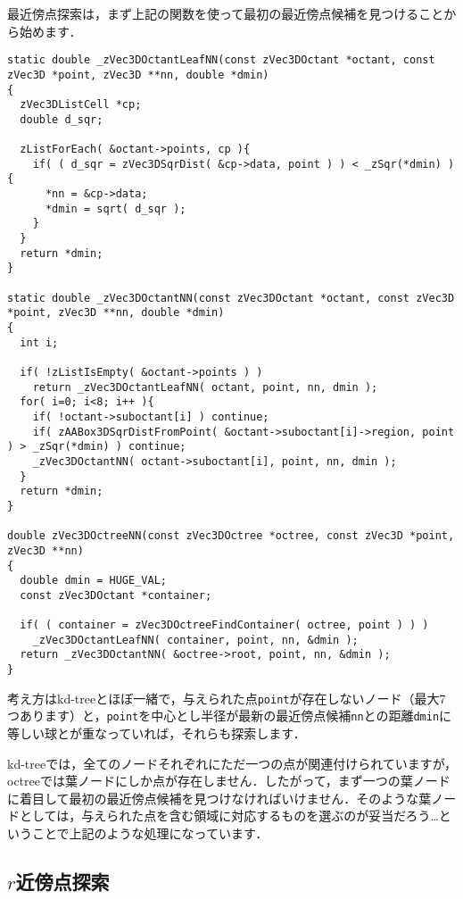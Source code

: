 ﻿\documentclass[a4paper]{jsarticle}
\begin{document}
最近傍点探索は，まず上記の関数を使って最初の最近傍点候補を見つけることから始めます．
\begin{screen}
\begin{verbatim}
static double _zVec3DOctantLeafNN(const zVec3DOctant *octant, const zVec3D *point, zVec3D **nn, double *dmin)
{
  zVec3DListCell *cp;
  double d_sqr;

  zListForEach( &octant->points, cp ){
    if( ( d_sqr = zVec3DSqrDist( &cp->data, point ) ) < _zSqr(*dmin) ){
      *nn = &cp->data;
      *dmin = sqrt( d_sqr );
    }
  }
  return *dmin;
}

static double _zVec3DOctantNN(const zVec3DOctant *octant, const zVec3D *point, zVec3D **nn, double *dmin)
{
  int i;

  if( !zListIsEmpty( &octant->points ) )
    return _zVec3DOctantLeafNN( octant, point, nn, dmin );
  for( i=0; i<8; i++ ){
    if( !octant->suboctant[i] ) continue;
    if( zAABox3DSqrDistFromPoint( &octant->suboctant[i]->region, point ) > _zSqr(*dmin) ) continue;
    _zVec3DOctantNN( octant->suboctant[i], point, nn, dmin );
  }
  return *dmin;
}

double zVec3DOctreeNN(const zVec3DOctree *octree, const zVec3D *point, zVec3D **nn)
{
  double dmin = HUGE_VAL;
  const zVec3DOctant *container;

  if( ( container = zVec3DOctreeFindContainer( octree, point ) ) )
    _zVec3DOctantLeafNN( container, point, nn, &dmin );
  return _zVec3DOctantNN( &octree->root, point, nn, &dmin );
}
\end{verbatim}
\end{screen}
考え方はkd-treeとほぼ一緒で，与えられた点\verb|point|が存在しないノード（最大7つあります）と，\verb|point|を中心とし半径が最新の最近傍点候補\verb|nn|との距離\verb|dmin|に等しい球とが重なっていれば，それらも探索します．

kd-treeでは，全てのノードそれぞれにただ一つの点が関連付けられていますが，octreeでは葉ノードにしか点が存在しません．したがって，まず一つの葉ノードに着目して最初の最近傍点候補を見つけなければいけません．そのような葉ノードとしては，与えられた点を含む領域に対応するものを選ぶのが妥当だろう…ということで上記のような処理になっています．

\subsection{$r$近傍点探索}
\end{document}
